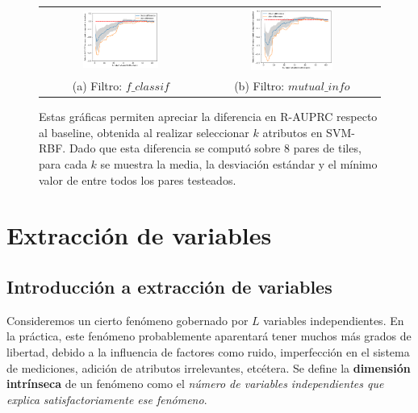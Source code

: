 \begin{figure}[h!]
\begin{tabular}{cc}
  \includegraphics[width=0.49\textwidth]{Kap5/rbfBEST_K_f_classif.png} &   \includegraphics[width=0.49\textwidth]{Kap5/rbfBEST_K_mutual_info_classif.png} \\
(a) Filtro: $f\_classif$ & (b) Filtro: $mutual\_info$
\end{tabular}
\caption{Estas gráficas permiten apreciar la diferencia en R-AUPRC respecto al baseline, obtenida al realizar seleccionar $k$ atributos en SVM-RBF. Dado que esta diferencia se computó sobre 8 pares de tiles, para cada $k$ se muestra la media, la desviación estándar y el mínimo valor de entre todos los pares testeados. }
\label{fig:optimal_k_svmk}
\end{figure}

\section{Extracción de variables}

\subsection{Introducción a extracción de variables}

Consideremos un cierto fenómeno gobernado por $L$ variables independientes. En la práctica, este fenómeno probablemente aparentará tener muchos más grados de libertad, debido a la influencia de factores como ruido, imperfección en el sistema de mediciones, adición de atributos irrelevantes, etcétera. Se define la \textbf{dimensión intrínseca} de un fenómeno como el \textit{número de variables independientes que explica satisfactoriamente ese 
fenómeno}\cite{carreira}. \\


